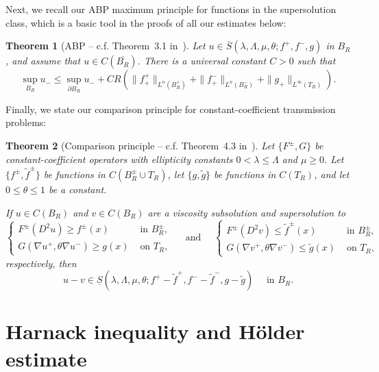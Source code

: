 \documentclass[letter,11pt]{amsart}
\newtheorem{thm}{Theorem}[section]
\theoremstyle{definition}
\numberwithin{equation}{section}
\begin{document}
\medskip

Next, we recall our ABP maximum principle for functions in the supersolution class, which is a basic tool in the proofs of all our estimates below:

\begin{thm}[ABP -- c.f. Theorem~3.1 in~\cite{E}]
\label{thm:abp}
Let $u \in \overline{S}(\lambda,\Lambda,\mu, \theta; f^{+}, f^{-}, g)$ in $B_R$, and assume that $u \in C(\overline{B_R})$.
There is a universal constant $C > 0$ such that
\[
\sup_{B_R} u_{-} \leq \sup_{\partial B_R} u_{-} + C R \left( 
\|f^{+}_{+}\|_{L^{n}(B_R^{+})} + \|f^{-}_{+}\|_{L^{n}(B_R^{-})} + \|g_{+}\|_{L^{\infty}(T_R)}
 \right).
\]
\end{thm}

\medskip

Finally, we state our comparison principle for constant-coefficient transmission problems:

\begin{thm}[Comparison principle -- c.f. Theorem~4.3 in~\cite{E}]
\label{thm:comp}
Let $\{F^{\pm},G\}$ be constant-coefficient operators with ellipticity constants $0 < \lambda \leq \Lambda$ and $\mu \geq 0$.
Let $\{f^{\pm}, \widetilde{f}^{\pm}\}$ be functions in $C(B^{\pm}_R \cup T_R)$, let $\{g, \widetilde{g}\}$ be functions in $C(T_R)$, and let $0 \leq \theta \leq 1$ be a constant.

If $u \in C(B_R)$ and $v \in C(B_R)$ are a viscosity subsolution and supersolution to 
\[
\begin{cases}
F^{\pm}(D^2 u) \geq f^{\pm}(x) & \text{ in } B_R^{\pm},\\
G(\nabla u^{+}, \theta \nabla u^{-}) \geq g(x) & \text{ on } T_R,
\end{cases}
\quad \text{ and } \quad
\begin{cases}
F^{\pm}(D^2 v) \leq \widetilde{f}^{\pm}(x) & \text{ in } B_R^{\pm},\\
G(\nabla v^{+}, \theta \nabla v^{-}) \leq \widetilde{g}(x) & \text{ on } T_R,
\end{cases}
\]
respectively, then
\[
u - v \in \underline{S}(\lambda,\Lambda,\mu,\theta; f^{+} - \widetilde{f}^{+}, f^{-} - \widetilde{f}^{-}, g - \widetilde{g}) \quad \text{ in } B_R.
\]
\end{thm}

\medskip

\section{Harnack inequality and H\"{o}lder estimate}
\label{sec:holder}
\end{document}
